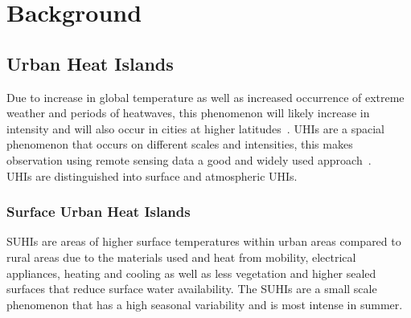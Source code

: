 \section{Background}
\subsection{Urban Heat Islands}

Due to increase in global temperature as well as increased occurrence of extreme weather and periods of heatwaves, this phenomenon will likely increase in intensity and will also occur in cities at higher latitudes~\cite{Sachindra2016}\cite[p.~904]{Wilby2008}.
\glspl{UHI} are a spacial phenomenon that occurs on different scales and intensities, this makes observation using remote sensing data a good and widely used approach~\cite{Weng2003}.\\
\glspl{UHI} are distinguished into surface and atmospheric \glspl{UHI}.

\subsubsection{Surface Urban Heat Islands}\label{sec:suhi}
\glspl{SUHI} are areas of higher surface temperatures within urban areas compared to rural areas due to the materials used and heat from mobility, electrical appliances, heating and cooling as well as less vegetation and higher sealed surfaces that reduce surface water availability\cite[pp. 7-12]{EPA2008}. 
The \glspl{SUHI} are a small scale phenomenon that has a high seasonal variability and is most intense in summer.

